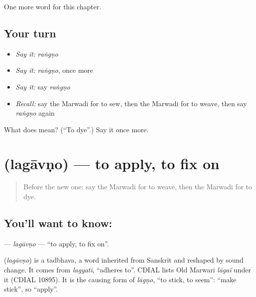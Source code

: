 \begin{grammarlens}[title={What you've built}]
One more word for this chapter.
\end{grammarlens}

\subsection*{Your turn}
\begin{itemize}
\raggedright
  \item \emph{Say it:} \emph{raṅgṇo}
  \item \emph{Say it:} \emph{raṅgṇo}, once more
  \item \emph{Say it:} say \emph{raṅgṇo}
  \item \emph{Recall:} say the Marwadi for to sew, then the Marwadi for to weave, then say \emph{raṅgṇo} again
\end{itemize}

\begin{tcolorbox}[breakable,colback=teal!4,colframe=teal!35!black,title={Before you move on}]
What does  mean? (\textquotedblleft{}To dye\textquotedblright{}.) Say it once more.
\end{tcolorbox}
\section[\texorpdfstring{\mw{लगावणो} (lagāvṇo)}{लगावणो (lagāvṇo)}]{ (lagāvṇo) — to apply, to fix on}

\label{lesson:MW-C107-lagavno}



\begin{quote}
Before the new one: say the Marwadi for to weave, then the Marwadi for to dye.
\end{quote}

\subsection*{You'll want to know: }
\textbf{} — \emph{lagāvṇo} — \textquotedblleft{}to apply, to fix on\textquotedblright{}.

\begin{cousinweb}
\textbf{} (\emph{lagāvṇo}) is a tadbhava, a word inherited from Sanskrit and reshaped by sound change. It comes from \emph{lagyati}, \textquotedblleft{}adheres to\textquotedblright{}. CDIAL lists Old Marwari \emph{lāgaï} under it (CDIAL 10895). It is the causing form of \emph{lāgṇo}, \textquotedblleft{}to stick, to seem\textquotedblright{}: \textquotedblleft{}make stick\textquotedblright{}, so \textquotedblleft{}apply\textquotedblright{}.
\end{cousinweb}

